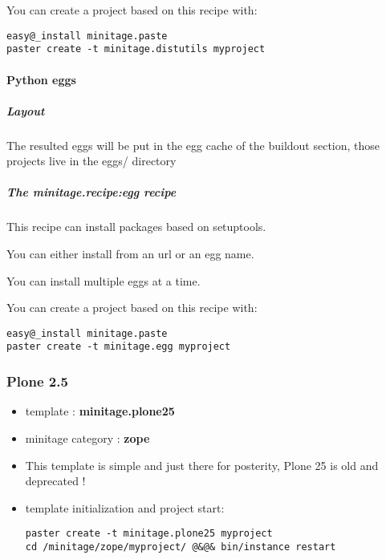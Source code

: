 \documentclass[letterpaper,10pt,english]{sphinxmanual}
\begin{document}
You can create a project based on this recipe with:

\begin{Verbatim}[commandchars=@\[\]]
easy@_install minitage.paste
paster create -t minitage.distutils myproject
\end{Verbatim}


\paragraph{Python eggs}
\label{paster/projects/packaging_projects:python-eggs}

\subparagraph{Layout}
\label{paster/projects/packaging_projects:id3}
The resulted eggs will be put in the egg cache of the buildout section, those projects live in the eggs/ directory


\subparagraph{The minitage.recipe:egg recipe}
\label{paster/projects/packaging_projects:the-minitage-recipe-egg-recipe}
This recipe can install packages based on setuptools.

You can either install from an url or an egg name.

You can install multiple eggs at a time.

You can create a project based on this recipe with:

\begin{Verbatim}[commandchars=@\[\]]
easy@_install minitage.paste
paster create -t minitage.egg myproject
\end{Verbatim}
\label{paster/projects/model_projects:minitagezope}

\subsubsection{Plone 2.5}
\label{paster/projects/model_projects:minitagezope}\label{paster/projects/model_projects:minitageplone25}\label{paster/projects/model_projects:plone-2-5}\label{paster/projects/model_projects::doc}\begin{itemize}
\item {} 
template : \textbf{minitage.plone25}

\item {} 
minitage category : \textbf{zope}

\item {} 
This template is simple and just there for posterity, Plone 25 is old and deprecated !

\item {} 
template initialization and project start:

\begin{Verbatim}[commandchars=@\[\]]
paster create -t minitage.plone25 myproject
cd /minitage/zope/myproject/ @&@& bin/instance restart
\end{Verbatim}

\end{itemize}
\end{document}
